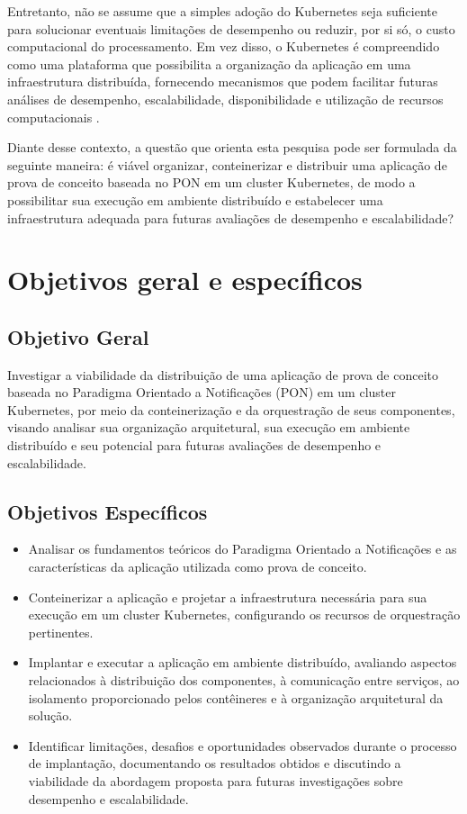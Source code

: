 Entretanto, não se assume que a simples adoção do Kubernetes seja suficiente para solucionar eventuais limitações de desempenho ou reduzir, por si só, o custo computacional do processamento. Em vez disso, o Kubernetes é compreendido como uma plataforma que possibilita a organização da aplicação em uma infraestrutura distribuída, fornecendo mecanismos que podem facilitar futuras análises de desempenho, escalabilidade, disponibilidade e utilização de recursos computacionais \cite{kubernetes2026documentation}.

Diante desse contexto, a questão que orienta esta pesquisa pode ser formulada da seguinte maneira: é viável organizar, conteinerizar e distribuir uma aplicação de prova de conceito baseada no PON em um cluster Kubernetes, de modo a possibilitar sua execução em ambiente distribuído e estabelecer uma infraestrutura adequada para futuras avaliações de desempenho e escalabilidade?


\section{Objetivos geral e específicos}

\subsection{Objetivo Geral}

Investigar a viabilidade da distribuição de uma aplicação de prova de conceito baseada no Paradigma Orientado a Notificações (PON) em um cluster Kubernetes, por meio da conteinerização e da orquestração de seus componentes, visando analisar sua organização arquitetural, sua execução em ambiente distribuído e seu potencial para futuras avaliações de desempenho e escalabilidade.

\subsection{Objetivos Específicos}


\begin{itemize}
\item Analisar os fundamentos teóricos do Paradigma Orientado a Notificações e as características da aplicação utilizada como prova de conceito.
\item Conteinerizar a aplicação e projetar a infraestrutura necessária para sua execução em um cluster Kubernetes, configurando os recursos de orquestração pertinentes.
\item Implantar e executar a aplicação em ambiente distribuído, avaliando aspectos relacionados à distribuição dos componentes, à comunicação entre serviços, ao isolamento proporcionado pelos contêineres e à organização arquitetural da solução.
\item Identificar limitações, desafios e oportunidades observados durante o processo de implantação, documentando os resultados obtidos e discutindo a viabilidade da abordagem proposta para futuras investigações sobre desempenho e escalabilidade.
\end{itemize}


